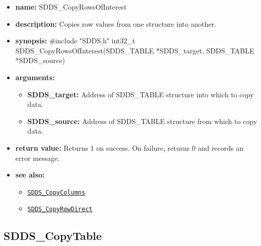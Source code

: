 \documentclass[11pt]{article}
\newcommand{\progref}[1]{\hyperref[SDDS_#1]{\tt SDDS\_#1}}
\begin{document}
\begin{itemize}
\item {\bf name:}\newline
SDDS\_CopyRowsOfInterest
\item {\bf description:}\newline
Copies row values from one structure into another.
\item {\bf synopsis:} \#include "SDDS.h"\newline
int32\_t SDDS\_CopyRowsOfInterest(SDDS\_TABLE *SDDS\_target, SDDS\_TABLE *SDDS\_source)
\item {\bf arguments:}
\begin{itemize}
\item {\bf SDDS\_target:} Address of SDDS\_TABLE structure into which to copy data.
\item {\bf SDDS\_source:} Address of SDDS\_TABLE structure from which to copy data.
\end{itemize}
\item {\bf return value:}\newline
Returns 1 on success. On failure, returns 0 and records an error message.
\item {\bf see also:}
\begin{itemize}
\item \progref{CopyColumns}
\item \progref{CopyRowDirect}
\end{itemize}
\end{itemize}

\subsection{SDDS\_CopyTable}
\label{SDDS_CopyTable}
\end{document}
